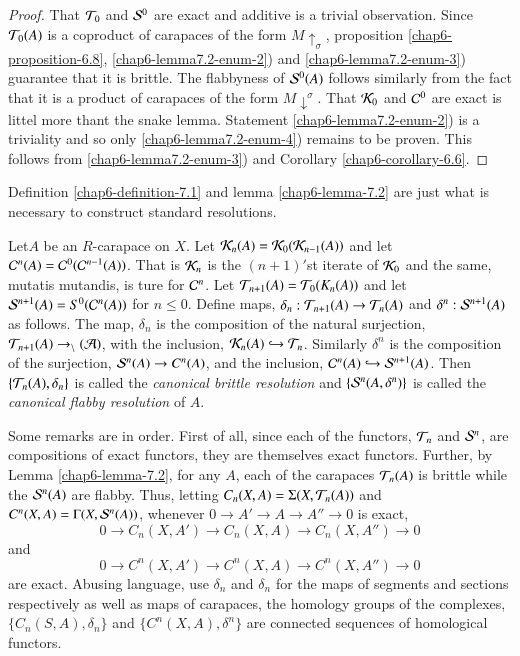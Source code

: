 \begin{proof}
That $\mathcal{T}_{0}$ and $\mathcal{S}^{0}$ are exact and additive is a trivial observation. Since $\mathcal{T}_{0}(A)$ is a coproduct of carapaces of the form $M\uparrow_{\sigma}$, proposition \ref{chap6-proposition-6.8}, \ref{chap6-lemma7.2-enum-2}) and \ref{chap6-lemma7.2-enum-3}) guarantee that it is brittle. The flabbyness of $\mathcal{S}^{0}(A)$ follows similarly from the fact that it is a product of carapaces of the form $M\downarrow^{\sigma}$. That $\mathcal{K}_{0}$ and $\mathcal{C}^{0}$ are exact is littel more thant the snake lemma. Statement \ref{chap6-lemma7.2-enum-2}) is a triviality and so only
\ref{chap6-lemma7.2-enum-4})  remains to be proven. This follows from \ref{chap6-lemma7.2-enum-3}) and Corollary
\ref{chap6-corollary-6.6}.  
\end{proof}

Definition \ref{chap6-definition-7.1} and lemma \ref{chap6-lemma-7.2} are just what is necessary to construct standard resolutions.

\begin{definition}\label{chap6-definition-7.3}
Let\pageoriginale $A$ be an $R$-carapace on $X$. Let $\mathcal{K}_{n}(A) = \mathcal{K}_{0}(\mathcal{K}_{n-1}(A))$ and let $\mathcal{C}^{n}(A) = \mathcal{C}^{0}(\mathcal{C}^{n-1}(A))$. That is $\mathcal{K}_{n}$ is the $(n+1)'$st iterate of $\mathcal{K}_{0}$ and the same, mutatis mutandis, is ture for $\mathcal{C}^{n}$. Let $\mathcal{T}_{n+1}(A) = \mathcal{T}_{0}(K_{n}(A))$ and let $\mathcal{S}^{n+1}(A) = S^{0}(\mathcal{C}^{n}(A))$ for $n\leq 0$. Define maps, $\delta_{n} : \mathcal{T}_{n+1}(A) \rightarrow \mathcal{T}_{n}(A)$ and $\delta^{n} : \mathcal{S}^{n+1}(A)$ as follows. The map, $\delta_{n}$ is the composition of the natural surjection, $\mathcal{T}_{n+1}(A)\rightarrow \cal_{n}(A)$, with the inclusion, $\mathcal{K}_{n}(A) \hookrightarrow \mathcal{T}_{n}$. Similarly $\delta^{n}$ is the composition of the surjection, $\mathcal{S}^{n}(A) \rightarrow C^{n}(A)$, and the inclusion, $\mathcal{C}^{n}(A) \hookrightarrow \mathcal{S}^{n+1}(A)$. Then $\{\mathcal{T}_{n}(A), \delta_{n}\}$ is called the \textit{canonical brittle resolution} and $\{\mathcal{S}^{n}(A, \delta^{n})\}$ is called the \textit{canonical flabby resolution} of $A$.  

Some remarks are in order. First of all, since each of the functors, $\mathcal{T}_{n}$ and $\mathcal{S}^{n}$, are compositions of exact functors, they are themselves exact functors. Further, by Lemma \ref{chap6-lemma-7.2}, for any $A$, each of the carapaces $\mathcal{T}_{n}(A)$ is brittle while the $\mathcal{S}^{n}(A)$ are flabby. Thus, letting $C_{n}(X, A) = \Sigma(X, \mathcal{T}_{n}(A))$ and $C^{n}(X, A)= \Gamma(X, \mathcal{S}^{n}(A))$, whenever $0 \rightarrow A' \rightarrow A \rightarrow A'' \rightarrow 0$ is exact,
$$
0 \rightarrow C_{n}(X, A') \rightarrow C_{n}(X, A)\rightarrow C_{n}(X, A'')\rightarrow 0
$$
and
$$
0 \rightarrow C^{n}(X, A') \rightarrow C^{n}(X, A) \rightarrow C^{n}(X, A'')\rightarrow 0
$$
are exact. Abusing language, use $\delta_{n}$  and $\delta_{n}$ for the maps of segments and sections respectively as well as maps of carapaces, the homology groups of the complexes, $\{C_{n}(S, A), \delta_{n}\}$ and $\{C^{n}(X, A), \delta^{n}\}$ are connected sequences of homological functors. 
\end{definition}

